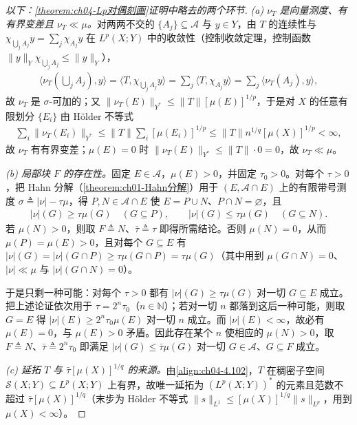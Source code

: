 \documentclass[../../main.tex]{subfiles}%
\begin{document}
\begin{proof}[以下：\cref{theorem:ch04-Lp对偶刻画}证明中略去的两个环节]
\emph{(a) $\nu_T$ 是向量测度、有有界变差且 $\nu_T\ll\mu$。}对两两不交的 $\{A_j\}\subseteq\mathcal{A}$ 与 $y\in Y$，由 $T$ 的连续性与 $\chi_{\bigcup_jA_j}y=\sum_j\chi_{A_j}y$ 在 $L^p(X;Y)$ 中的收敛性（控制收敛定理，控制函数 $\|y\|_Y\chi_{\bigcup_jA_j}\leqslant\|y\|_Y$），
\begin{align*}
\langle\nu_T(\textstyle\bigcup_jA_j),y\rangle=\langle T,\chi_{\bigcup_jA_j}y\rangle=\sum_j\langle T,\chi_{A_j}y\rangle=\sum_j\langle\nu_T(A_j),y\rangle,
\end{align*}
故 $\nu_T$ 是 $\sigma$-可加的；又 $\|\nu_T(E)\|_{Y^*}\leqslant\|T\|[\mu(E)]^{1/p}$，于是对 $X$ 的任意有限划分 $\{E_i\}$ 由 Hölder 不等式
\begin{align*}
\sum_i\|\nu_T(E_i)\|_{Y^*}\leqslant\|T\|\sum_i[\mu(E_i)]^{1/p}\leqslant\|T\|n^{1/q}[\mu(X)]^{1/p}<\infty,
\end{align*}
故 $\nu_T$ 有有界变差；$\mu(E)=0$ 时 $\|\nu_T(E)\|_{Y^*}\leqslant\|T\|\cdot0=0$，故 $\nu_T\ll\mu$。

\emph{(b) 局部块 $F$ 的存在性。}固定 $E\in\mathcal{A}$，$\mu(E)>0$，并固定 $\tau_0>0$。对每个 $\tau>0$，把 Hahn 分解（\cref{theorem:ch01-Hahn分解}）用于 $(E,\mathcal{A}\cap E)$ 上的有限带号测度 $\sigma\triangleq|\nu|-\tau\mu$，得 $P,N\in\mathcal{A}\cap E$ 使 $E=P\cup N$、$P\cap N=\varnothing$，且
\begin{align*}
|\nu|(G)\geqslant\tau\mu(G)\quad(G\subseteq P),\qquad |\nu|(G)\leqslant\tau\mu(G)\quad(G\subseteq N).
\end{align*}
若 $\mu(N)>0$，则取 $F\triangleq N$、$\bar\tau\triangleq\tau$ 即得所需结论。否则 $\mu(N)=0$，从而 $\mu(P)=\mu(E)>0$，且对每个 $G\subseteq E$ 有 $|\nu|(G)=|\nu|(G\cap P)\geqslant\tau\mu(G\cap P)=\tau\mu(G)$（其中用到 $\mu(G\cap N)=0$、$|\nu|\ll\mu$ 与 $|\nu|(G\cap N)=0$）。

于是只剩一种可能：对每个 $\tau>0$ 都有 $|\nu|(G)\geqslant\tau\mu(G)$ 对一切 $G\subseteq E$ 成立。把上述论证依次用于 $\tau=2^n\tau_0$（$n\in\mathbb{N}$）；若对一切 $n$ 都落到这后一种可能，则取 $G=E$ 得 $|\nu|(E)\geqslant2^n\tau_0\mu(E)$ 对一切 $n$ 成立。而 $|\nu|(E)<\infty$，故必有 $\mu(E)=0$，与 $\mu(E)>0$ 矛盾。因此存在某个 $n$ 使相应的 $\mu(N)>0$，取 $F\triangleq N$、$\bar\tau\triangleq2^n\tau_0$ 即满足 $|\nu|(G)\leqslant\bar\tau\mu(G)$ 对一切 $G\in\mathcal{A}$、$G\subseteq F$ 成立。

\emph{(c) 延拓 $T$ 与 $\bar\tau[\mu(X)]^{1/q}$ 的来源。}由\eqref{align:ch04-4.102}，$T$ 在稠密子空间 $\mathcal{S}(X;Y)\subseteq L^p(X;Y)$ 上有界，故唯一延拓为 $(L^p(X;Y))^*$ 的元素且范数不超过 $\bar\tau[\mu(X)]^{1/q}$（末步为 Hölder 不等式 $\|s\|_{L^1}\leqslant[\mu(X)]^{1/q}\|s\|_{L^p}$，用到 $\mu(X)<\infty$）。
\end{proof}
\end{document}
